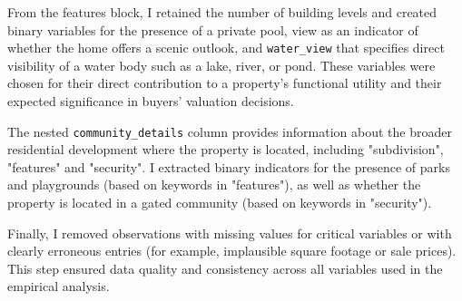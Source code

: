 From the features block, I retained the number of building levels and created binary variables for the presence of a private pool, view as an indicator of whether the home offers a scenic outlook, and \texttt{water\_view} that specifies direct visibility of a water body such as a lake, river, or pond. These variables were chosen for their direct contribution to a property's functional utility and their expected significance in buyers’ valuation decisions.

The nested \texttt{community\_details} column provides information about the broader residential development where the property is located, including "subdivision", "features" and "security". I extracted binary indicators for the presence of parks and playgrounds (based on keywords in "features"), as well as whether the property is located in a gated community (based on keywords in "security").

Finally, I removed observations with missing values for critical variables or with clearly erroneous entries (for example, implausible square footage or sale prices). This step ensured data quality and consistency across all variables used in the empirical analysis.
